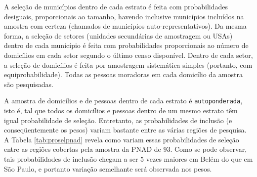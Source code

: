 \documentclass[]{book}
\theoremstyle{definition}
\theoremstyle{definition}
\theoremstyle{definition}
\theoremstyle{remark}
\begin{document}
A seleção de municípios dentro de cada estrato é feita com
probabilidades desiguais, proporcionais ao tamanho, havendo inclusive
municípios incluídos na amostra com certeza (chamados de municípios
auto-representativos). Da mesma forma, a seleção de setores (unidades
secundárias de amostragem ou USAs) dentro de cada município é feita com
probabilidades proporcionais ao número de domicílios em cada setor
segundo o último censo disponível. Dentro de cada setor, a seleção de
domicílios é feita por amostragem sistemática simples (portanto, com
equiprobabilidade). Todas as pessoas moradoras em cada domicílio da
amostra são pesquisadas.

A amostra de domicílios e de pessoas dentro de cada estrato é
\texttt{autoponderada}, isto é, tal que todos os domicílios e pessoas
dentro de um mesmo estrato têm igual probabilidade de seleção.
Entretanto, as probabilidades de inclusão (e conseqüentemente os pesos)
variam bastante entre as várias regiões de pesquisa. A Tabela
\ref{tab:proselpnad} revela como variam essas probabilidades de seleção
entre as regiões cobertas pela amostra da PNAD de 93. Como se pode
observar, tais probabilidades de inclusão chegam a ser \(5\) vezes
maiores em Belém do que em São Paulo, e portanto variação semelhante
será observada nos pesos.
\end{document}
